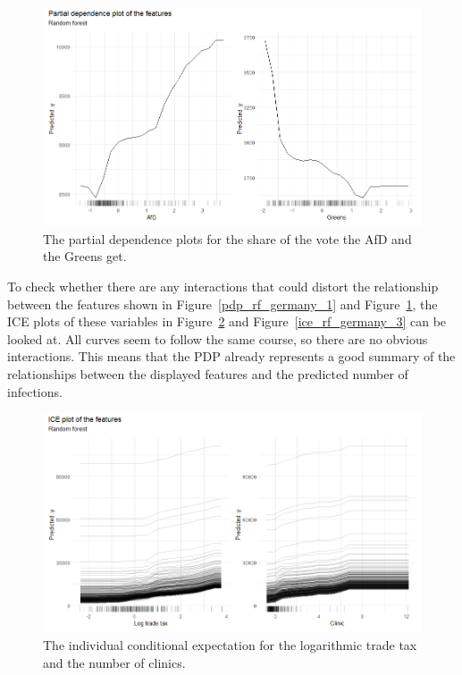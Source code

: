 \begin{figure}[H]
  \centering
  \includegraphics[width = \textwidth]{pdp_rf_germany_3.png}
  \caption{The partial dependence plots for the share of the vote the AfD and the Greens get.}
  \label{pdp_rf_germany_3}
\end{figure}
To check whether there are any interactions that could distort the relationship between the features shown in Figure~\ref{pdp_rf_germany_1} and Figure~\ref{pdp_rf_germany_3}, the ICE plots of these variables in Figure~\ref{ice_rf_germany_1} and Figure~\ref{ice_rf_germany_3} can be looked at. All curves seem to follow the same course, so there are no obvious interactions. This means that the PDP already represents a good summary of the relationships between the displayed features and the predicted number of infections.
\begin{figure}[H]
  \centering
  \includegraphics[width = \textwidth]{ice_rf_germany_1.png}
  \caption{The individual conditional expectation for the logarithmic trade tax and the number of clinics.}
  \label{ice_rf_germany_1}
\end{figure}
